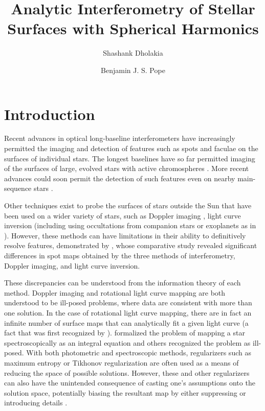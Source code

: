 \documentclass[modern]{aastex631}
\begin{document}
\title{Analytic Interferometry of Stellar Surfaces with Spherical Harmonics}

\author{Shashank Dholakia} \author{Benjamin J. S. Pope}

\begin{abstract}
\end{abstract}

\section{Introduction}
\label{sec:intro}
Recent advances in optical long-baseline interferometers have increasingly permitted the imaging and detection of features such as spots and faculae on the surfaces of individual stars. The longest baselines have so far permitted imaging of the surfaces of large, evolved stars with active chromospheres \citep{roettenbacher2016, martinez2021}. More recent advances could soon permit the detection of such features even on nearby main-sequence stars \citep{mourard2018, roettenbacher2022}.

Other techniques exist to probe the surfaces of stars outside the Sun that have been used on a wider variety of stars, such as Doppler imaging \citep{vogt1987}, light curve inversion \citep{harmon2000} (including using occultations from companion stars or exoplanets as in \citet{morris2017}). However, these methods can have limitations in their ability to definitively resolve features, demonstrated by \cite{roettenbacher2017}, whose comparative study revealed significant differences in spot maps obtained by the three methods of interferometry, Doppler imaging, and light curve inversion. 

These discrepancies can be understood from the information theory of each method. Doppler imaging and rotational light curve mapping are both understood to be ill-posed problems, where data are consistent with more than one solution. In the case of rotational light curve mapping, there are in fact an infinite number of surface maps that can analytically fit a given light curve (a fact that was first recognized by \citet{russell1906}). \citet{khoklova1976} formalized the problem of mapping a star spectroscopically as an integral equation and others \citep{goncharskii1977, piskunov1990} recognized the problem as ill-posed. With both photometric and spectroscopic methods, regularizers such as maximum entropy \citep{narayan1986} or Tikhonov regularization \citep{tikhonov1987} are often used as a means of reducing the space of possible solutions. However, these and other regularizers can also have the unintended consequence of casting one's assumptions onto the solution space, potentially biasing the resultant map by either suppressing or introducing details \citep{piskunov1990b}. 
\end{document}
